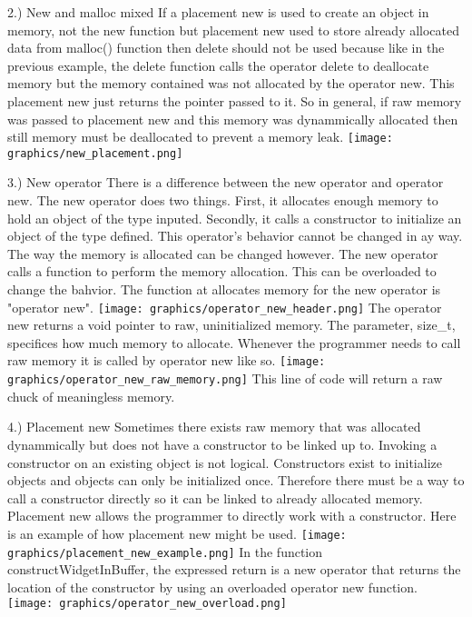 \documentclass[letterpaper, 12pt]{article}
\begin{document}
2.) New and malloc mixed
	If a placement new is used to create an object in memory, not the new function but placement new used to store already allocated data from malloc() function then delete should not be used because like in the previous example, the delete function calls the operator delete to deallocate memory but the memory contained was not allocated by the operator new. This placement new just returns the pointer passed to it. So in general, if raw memory was passed to placement new and this memory was dynammically allocated then still memory must be deallocated to prevent a memory leak.
	\texttt{[image: graphics/new\_placement.png]}
	\cite{boostuse}

3.) New operator
	There is a difference between the new operator and operator new. The new operator does two things.
	First, it allocates enough memory to hold an object of the type inputed. Secondly, it calls a constructor to initialize an object of the type defined. This operator's behavior cannot be changed in ay way. The way the memory is allocated can be changed however. The new operator calls a function to perform the memory allocation. This can be overloaded to change the bahvior. The function at allocates memory for the new operator is "operator new". 
	\texttt{[image: graphics/operator\_new\_header.png]}
	\cite{boostuse}
	The operator new returns a void pointer to raw, uninitialized memory. The parameter, size_t, specifices how much memory to allocate. Whenever the programmer needs to call raw memory it is called by operator new like so.
	\texttt{[image: graphics/operator\_new\_raw\_memory.png]}
	\cite{boostuse}
	This line of code will return a raw chuck of meaningless memory.

4.) Placement new
	Sometimes there exists raw memory that was allocated dynammically but does not have a constructor to be linked up to. Invoking a constructor on an existing object is not logical. Constructors exist to initialize objects and objects can only be initialized once. Therefore there must be a way to call a constructor directly so it can be linked to already allocated memory. Placement new allows the programmer to directly work with a constructor. Here is an example of how placement new might be used.
	\texttt{[image: graphics/placement\_new\_example.png]}
	\cite{boostuse}
	In the function constructWidgetInBuffer, the expressed return is a new operator that returns the location of the constructor by using an overloaded operator new function.
	\texttt{[image: graphics/operator\_new\_overload.png]}
\end{document}
